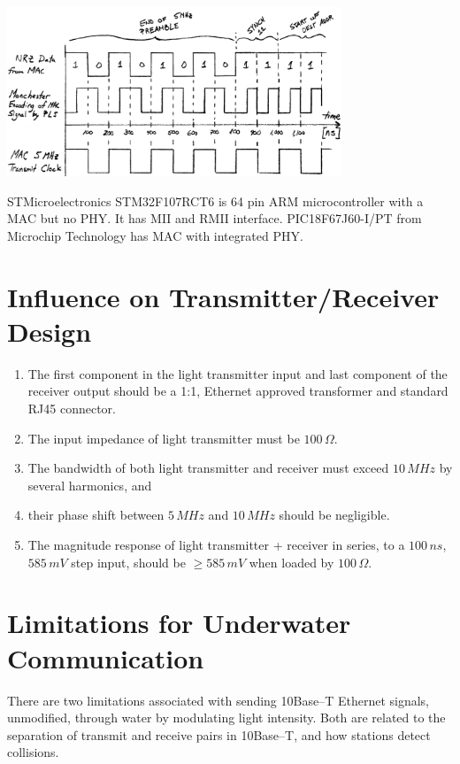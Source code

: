 \documentclass{article}
\begin{document}
\begin{center}
	\includegraphics[width=0.75\textwidth]{timing_diagram.png}
	\label{timing-diagram}
\end{center}

STMicroelectronics STM32F107RCT6 is 64 pin ARM microcontroller with a MAC but no PHY. It has MII and RMII interface.
PIC18F67J60-I/PT from Microchip Technology has MAC with integrated PHY.

\section{Influence on Transmitter/Receiver Design}

\begin{enumerate}
\item The first component in the light transmitter input
and last component of the receiver output should be a 1:1, Ethernet approved
transformer and standard RJ45 connector.
\item The input impedance of light transmitter must be $100\,\Omega$.
\item The bandwidth of both light transmitter and receiver must exceed $10\,MHz$
by several harmonics, and
\item their phase shift between $5\,MHz$ and $10\,MHz$ should be negligible.
\item The magnitude response of light transmitter + receiver in series,
to a $100\,ns$, $585\,mV$ step input, should be $\geq585\,mV$ when loaded by $100\,\Omega$.
\end{enumerate}

\section{Limitations for Underwater Communication}

There are two limitations associated with sending 10Base--T Ethernet signals,
unmodified, through water by modulating light intensity.
Both are related to the separation of transmit and receive pairs
in 10Base--T, and how stations detect collisions.
\end{document}
